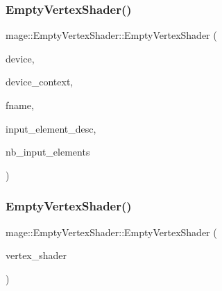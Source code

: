 \subsubsection{\texorpdfstring{Empty\+Vertex\+Shader()}{EmptyVertexShader()}\hspace{0.1cm}{\footnotesize\ttfamily [1/3]}}
{\footnotesize\ttfamily mage\+::\+Empty\+Vertex\+Shader\+::\+Empty\+Vertex\+Shader (\begin{DoxyParamCaption}\item[{I\+D3\+D11\+Device2 $\ast$}]{device,  }\item[{I\+D3\+D11\+Device\+Context2 $\ast$}]{device\+\_\+context,  }\item[{const wstring \&}]{fname,  }\item[{const D3\+D11\+\_\+\+I\+N\+P\+U\+T\+\_\+\+E\+L\+E\+M\+E\+N\+T\+\_\+\+D\+E\+SC $\ast$}]{input\+\_\+element\+\_\+desc,  }\item[{uint32\+\_\+t}]{nb\+\_\+input\+\_\+elements }\end{DoxyParamCaption})\hspace{0.3cm}{\ttfamily [explicit]}}

\hypertarget{classmage_1_1_empty_vertex_shader_a6ab1b22d108fde8f8876e6a2e4c0decb}{}\label{classmage_1_1_empty_vertex_shader_a6ab1b22d108fde8f8876e6a2e4c0decb} 
\subsubsection{\texorpdfstring{Empty\+Vertex\+Shader()}{EmptyVertexShader()}\hspace{0.1cm}{\footnotesize\ttfamily [2/3]}}
{\footnotesize\ttfamily mage\+::\+Empty\+Vertex\+Shader\+::\+Empty\+Vertex\+Shader (\begin{DoxyParamCaption}\item[{const \hyperlink{classmage_1_1_empty_vertex_shader}{Empty\+Vertex\+Shader} \&}]{vertex\+\_\+shader }\end{DoxyParamCaption})\hspace{0.3cm}{\ttfamily [delete]}}

\hypertarget{classmage_1_1_empty_vertex_shader_a04d905fda6f77338521746fee50e6bf7}{}\label{classmage_1_1_empty_vertex_shader_a04d905fda6f77338521746fee50e6bf7} 

